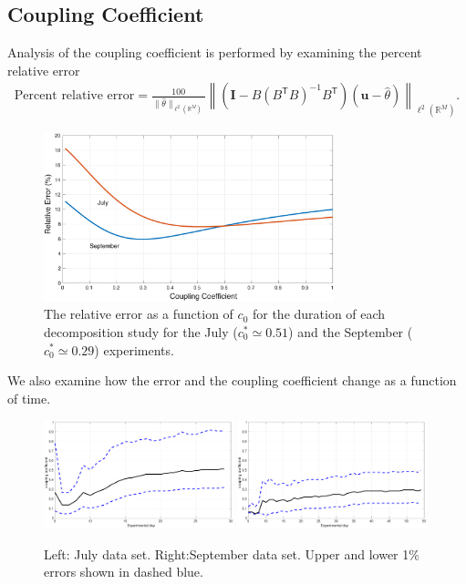 \documentclass{beamer}
\begin{document}
\subsection{Coupling Coefficient}
\begin{frame}
Analysis of the coupling coefficient is performed by examining the
percent relative error
\begin{align}
\label{myrelerror}
    \textrm{Percent relative error} = 
    \frac{100}{\|\hat{\theta}\|_{\ell^2(\mathbb{R}^M)}}
    \left\|\left(\mathbf{I}- B(B^{\textsf{T}}B)^{-1}B^{\textsf{T}}\right)
    (\mathbf{u}-\hat{\theta})\right\|_{\ell^2(\mathbb{R}^M)}.
\end{align}

\begin{figure}
  \includegraphics[width=0.75\textwidth]{Figures/sept_jul_err_n}
  \caption{The relative error as a function of $c_0$ for 
the duration of each decomposition study for the July 
($c_0^*\simeq 0.51$) and the September ($c_0^*\simeq 0.29$) 
experiments.}
\end{figure}
\end{frame}

\begin{frame}
We also examine how the error and the coupling coefficient
change as a function of time.
\begin{figure}
\includegraphics[width=0.49\textwidth]{Figures/jul_c_bounds}
\includegraphics[width=0.49\textwidth]{Figures/sept_c_bounds2}
\caption{Left: July data set. Right:September data set. Upper and
  lower 1\% errors shown in dashed blue.}
\end{figure}

\end{frame}
\end{document}
